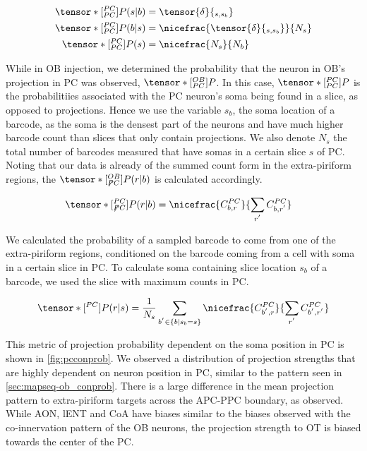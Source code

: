 \documentclass[../dissertation.tex]{subfiles}
\begin{document}
\begin{align}
    \tensor*[^{PC}_{PC}]{P}{} (s | b) & = \tensor{\delta}{_{s, s_b}}                    \\
    \tensor*[^{PC}_{PC}]{P}{} (b | s) & = \nicefrac{\tensor{\delta}{_{s, s_b}}}{N_s}    \\
    \tensor*[^{PC}_{PC}]{P}{} (s)     & = \nicefrac{N_s}{N_b}
\end{align}

While in OB injection, we determined the probability that the neuron in OB's projection in PC was observed, $\tensor*[^{OB}_{PC}]{P}{}$.
In this case, $\tensor*[^{PC}_{PC}]{P}{}$ is the probabilitiies associated with the PC neuron's soma being found in a slice, as opposed to projections.
Hence we use the variable $s_b$, the soma location of a barcode, as the soma is the densest part of the neurons and have much higher barcode count than slices that only contain projections.
We also denote $N_s$ the total number of barcodes measured that have somas in a certain slice $s$ of PC.
Noting that our data is already of the summed count form in the extra-piriform regions, the $\tensor*[^{OB}_{\not PC}]{P}{} (r | b)$ is calculated accordingly.

\begin{align}
    \tensor*[^{PC}_{\not PC}]{P}{} (r | b) & = \nicefrac{C^{PC}_{b, r}}{\sum_{r^{'}} C^{PC}_{b, r^{'}}}
\end{align}

We calculated the probability of a sampled barcode to come from one of the extra-piriform regions, conditioned on the barcode coming from a cell with soma in a certain slice in PC.
To calculate soma containing slice location $s_b$ of a barcode, we used the slice with maximum counts in PC.

\begin{align}
    \tensor*[^{PC}]{P}{} (r | s) =
        \frac{1}{N_s}
        \sum_{ b^{'} \in \left\{ b | s_b = s \right\}}
        \nicefrac{C^{PC}_{b^{'} , r}}{\sum_{r^{'}} C^{PC}_{b^{'} , r^{'}}}
\end{align}

This metric of projection probability dependent on the soma position in PC is shown in \cref{fig:pcconprob}.
We observed a distribution of projection strengths that are highly dependent on neuron position in PC, similar to the pattern seen in \cref{sec:mapseq-ob_conprob}.
There is a large difference in the mean projection pattern to extra-piriform targets across the APC-PPC boundary, as observed.
While AON, lENT and CoA have biases similar to the biases observed with the co-innervation pattern of the OB neurons, the projection strength to OT is biased towards the center of the PC.
\end{document}
